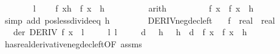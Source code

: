 \begin{isabellebody}
\ \ \ \ \ \ \isamarkupfalse%
\ l\ \isamarkupfalse%
\ {\isachardoublequoteopen}{}\ {\isacharless}{\kern0pt}\ {\isacharparenleft}{\kern0pt}f\ {\isacharparenleft}{\kern0pt}x{\isacharminus}{\kern0pt}h{\isacharparenright}{\kern0pt}\ {\isacharminus}{\kern0pt}\ f\ x{\isacharparenright}{\kern0pt}\ {\isacharslash}{\kern0pt}\ h{\isachardoublequoteclose}\isanewline
\ \ \ \ \ \ \ \ \isamarkupfalse%
\ arith\isanewline
\ \ \ \ \ \ \isamarkupfalse%
\ \isamarkupfalse%
\ {\isachardoublequoteopen}f\ x\ {\isacharless}{\kern0pt}\ f\ {\isacharparenleft}{\kern0pt}x\ {\isacharminus}{\kern0pt}\ h{\isacharparenright}{\kern0pt}{\isachardoublequoteclose}\isanewline
\ \ \ \ \ \ \ \ \isamarkupfalse%
\ {\isacharparenleft}{\kern0pt}simp\ add{\isacharcolon}{\kern0pt}\ pos{\isacharunderscore}{\kern0pt}less{\isacharunderscore}{\kern0pt}divide{\isacharunderscore}{\kern0pt}eq\ h{\isacharparenright}{\kern0pt}\isanewline
\ \ \ \ \isamarkupfalse%
\isanewline
\ \ \isamarkupfalse%
\isanewline
{}\isamarkupfalse%
%
\endisatagproof
{\isafoldproof}%
%
\isadelimproof
\isanewline
%
\endisadelimproof
\isanewline
{}\isamarkupfalse%
\ DERIV{\isacharunderscore}{\kern0pt}neg{\isacharunderscore}{\kern0pt}dec{\isacharunderscore}{\kern0pt}left{\isacharcolon}{\kern0pt}\isanewline
\ \ \ f\ {\isacharcolon}{\kern0pt}{\isacharcolon}{\kern0pt}\ {\isachardoublequoteopen}real\ {\isasymRightarrow}\ real{\isachardoublequoteclose}\isanewline
\ \ \ der{\isacharcolon}{\kern0pt}\ {\isachardoublequoteopen}DERIV\ f\ x\ {\isacharcolon}{\kern0pt}{\isachargreater}{\kern0pt}\ l{\isachardoublequoteclose}\isanewline
\ \ \ \ \ l{\isacharcolon}{\kern0pt}\ {\isachardoublequoteopen}l\ {\isacharless}{\kern0pt}\ {}{\isachardoublequoteclose}\isanewline
\ \ \ {\isachardoublequoteopen}{\isasymexists}d\ {\isachargreater}{\kern0pt}\ {}{\isachardot}{\kern0pt}\ {\isasymforall}h\ {\isachargreater}{\kern0pt}\ {}{\isachardot}{\kern0pt}\ h\ {\isacharless}{\kern0pt}\ d\ {\isasymlongrightarrow}\ f\ x\ {\isacharless}{\kern0pt}\ f\ {\isacharparenleft}{\kern0pt}x\ {\isacharminus}{\kern0pt}\ h{\isacharparenright}{\kern0pt}{\isachardoublequoteclose}\isanewline
%
\isadelimproof
\ \ %
\endisadelimproof
%
\isatagproof
{}\isamarkupfalse%
\ has{\isacharunderscore}{\kern0pt}real{\isacharunderscore}{\kern0pt}derivative{\isacharunderscore}{\kern0pt}neg{\isacharunderscore}{\kern0pt}dec{\isacharunderscore}{\kern0pt}left{\isacharbrackleft}{\kern0pt}OF\ assms{\isacharbrackright}{\kern0pt}\isanewline

\end{isabellebody}
